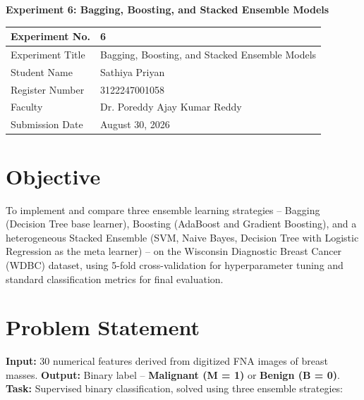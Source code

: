 \documentclass[11pt,a4paper]{article}
\begin{document}
\begin{center}
{\Large\bfseries Experiment 6: Bagging, Boosting, and Stacked Ensemble Models}
\end{center}
\vspace{4pt}

\begin{tabular}{|p{4cm}|p{11cm}|}
\hline
Experiment No. & 6 \\ \hline
Experiment Title & Bagging, Boosting, and Stacked Ensemble Models \\ \hline
Student Name & Sathiya Priyan \\ \hline
Register Number & 3122247001058 \\ \hline
Faculty & Dr. Poreddy Ajay Kumar Reddy \\ \hline
Submission Date & August 30, 2026 \\ \hline
\end{tabular}

\vspace{6pt}

\section{Objective}
To implement and compare three ensemble learning strategies -- Bagging (Decision Tree base learner),
Boosting (AdaBoost and Gradient Boosting), and a heterogeneous Stacked Ensemble (SVM, Naive Bayes,
Decision Tree with Logistic Regression as the meta learner) -- on the Wisconsin Diagnostic Breast
Cancer (WDBC) dataset, using 5-fold cross-validation for hyperparameter tuning and standard
classification metrics for final evaluation.

\section{Problem Statement}
\textbf{Input:} 30 numerical features derived from digitized FNA images of breast masses.
\textbf{Output:} Binary label -- \textbf{Malignant (M = 1)} or \textbf{Benign (B = 0)}.
\textbf{Task:} Supervised binary classification, solved using three ensemble strategies:
\end{document}
